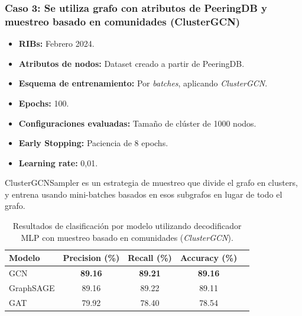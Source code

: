 

\subsubsection{Caso 3: Se utiliza grafo con atributos de PeeringDB y muestreo basado en comunidades (ClusterGCN)}

\begin{itemize}
    \item \textbf{RIBs:} Febrero 2024.
    \item \textbf{Atributos de nodos:} Dataset creado a partir de PeeringDB.
    \item \textbf{Esquema de entrenamiento:} Por \textit{batches}, aplicando \textit{ClusterGCN}.
    \item \textbf{Epochs:} 100.
    \item \textbf{Configuraciones evaluadas:} Tamaño de  clúster de 1000 nodos.    
    \item \textbf{Early Stopping:} Paciencia de 8 epochs.
    \item \textbf{Learning rate:} 0,01.
\end{itemize}


ClusterGCNSampler es un estrategia de muestreo que divide el grafo en clusters, y entrena usando mini-batches basados en esos subgrafos en lugar de todo el grafo.\\


\begin{table}[H]
\centering

\begin{tabular}{lcccc}
\toprule
\textbf{Modelo} & \textbf{Precision (\%)}  & \textbf{Recall (\%)} & \textbf{Accuracy (\%)} \\
\midrule
GCN & \textbf{89.16} & \textbf{89.21} & \textbf{89.16} \\
GraphSAGE & 89.16 & 89.22 & 89.11 \\
GAT & 79.92 & 78.40 & 78.54 \\
\bottomrule
\end{tabular}

\caption{Resultados de clasificación por modelo utilizando decodificador MLP con muestreo basado en comunidades (\textit{ClusterGCN}).}

\label{tab:caso3_mlp_clustergcn}
\end{table}




